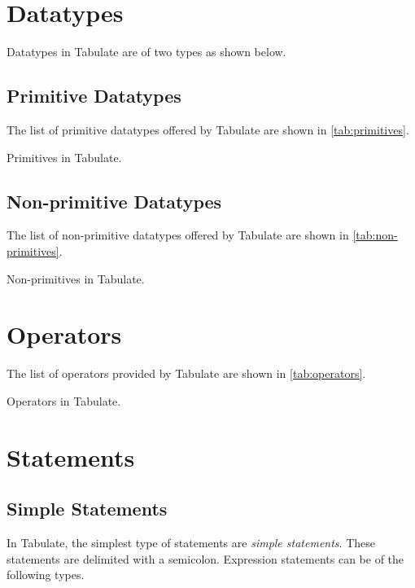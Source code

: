 \documentclass[conference,compsoc]{IEEEtran}
\begin{document}
\section{Datatypes}
Datatypes in Tabulate are of two types as shown below.

\subsection{Primitive Datatypes}
The list of primitive datatypes offered by Tabulate are shown in
\autoref{tab:primitives}.

\begin{table}[!ht]
  
  \vspace{3mm}
  \caption{Primitives in Tabulate.}
  \label{tab:primitives}
\end{table}

\subsection{Non-primitive Datatypes}
The list of non-primitive datatypes offered by Tabulate are shown in
\autoref{tab:non-primitives}.

\begin{table}[!ht]
  
  \vspace{3mm}
  \caption{Non-primitives in Tabulate.}
  \label{tab:non-primitives}
\end{table}

\section{Operators}
The list of operators provided by Tabulate are shown in \autoref{tab:operators}.

\begin{table}[!ht]
  
  \vspace{3mm}
  \caption{Operators in Tabulate.}
  \label{tab:operators}
\end{table}

\section{Statements}

\subsection{Simple Statements}
In Tabulate, the simplest type of statements are \emph{simple statements}.
These statements are delimited with a semicolon. Expression statements can be of
the following types.
\end{document}
